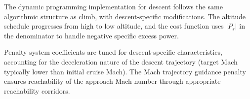 The dynamic programming implementation for descent follows the same algorithmic structure as climb, with descent-specific modifications. The altitude schedule progresses from high to low altitude, and the cost function uses $|P_s|$ in the denominator to handle negative specific excess power.

Penalty system coefficients are tuned for descent-specific characteristics, accounting for the deceleration nature of the descent trajectory (target Mach typically lower than initial cruise Mach). The Mach trajectory guidance penalty ensures reachability of the approach Mach number through appropriate reachability corridors.
